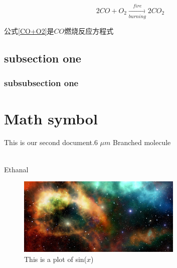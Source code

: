 \documentclass[a4paper,11pt]{ctexart}
\begin{document}
\begin{equation}
2CO + O_2\xrightarrow[burning]{fire}  2CO_2  
\label{CO+O2}
\end{equation}

公式\eqref{CO+O2}是$CO$燃烧反应方程式
\subsection{subsection one}
\zhlipsum[1-2]

\subsubsection{subsubsection one}
\zhlipsum[1-2]		
\newpage

\section{Math symbol}
This is our second document.6 $\mu m$ 
Branched molecule \vspace{.5cm}

\quad{}\vspace{1cm}\\

{ 
    \chemname
    {}    
    {Ethanal}
}\vspace{.5cm}
\begin{figure}[!h]
\centering
\includegraphics[width=0.7\textwidth]{Rplot}
\caption{This is a plot of sin($x$)}
\end{figure}
\end{document}
